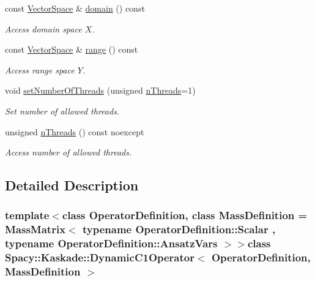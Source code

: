 \begin{DoxyCompactItemize}
\item 
const \hyperlink{classSpacy_1_1VectorSpace}{Vector\+Space} \& \hyperlink{classSpacy_1_1OperatorBase_a2588f9b3e0188820c4c494e63293dc6f_a2588f9b3e0188820c4c494e63293dc6f}{domain} () const 
\begin{DoxyCompactList}\small\item\em Access domain space $X$. \end{DoxyCompactList}\item 
const \hyperlink{classSpacy_1_1VectorSpace}{Vector\+Space} \& \hyperlink{classSpacy_1_1OperatorBase_ab19d3b7a6f290b1079248f1e567e53d6_ab19d3b7a6f290b1079248f1e567e53d6}{range} () const 
\begin{DoxyCompactList}\small\item\em Access range space $Y$. \end{DoxyCompactList}\item 
void \hyperlink{classSpacy_1_1Mixin_1_1NumberOfThreads_ab0c2fca77cb0d613e3bb8ce5bda11fdc_ab0c2fca77cb0d613e3bb8ce5bda11fdc}{set\+Number\+Of\+Threads} (unsigned \hyperlink{classSpacy_1_1Mixin_1_1NumberOfThreads_a385963b95b5e1ddf422393146cc71ee1_a385963b95b5e1ddf422393146cc71ee1}{n\+Threads}=1)
\begin{DoxyCompactList}\small\item\em Set number of allowed threads. \end{DoxyCompactList}\item 
unsigned \hyperlink{classSpacy_1_1Mixin_1_1NumberOfThreads_a385963b95b5e1ddf422393146cc71ee1_a385963b95b5e1ddf422393146cc71ee1}{n\+Threads} () const noexcept
\begin{DoxyCompactList}\small\item\em Access number of allowed threads. \end{DoxyCompactList}\end{DoxyCompactItemize}


\subsection{Detailed Description}
\subsubsection*{template$<$class Operator\+Definition, class Mass\+Definition = Mass\+Matrix$<$ typename Operator\+Definition\+::\+Scalar , typename Operator\+Definition\+::\+Ansatz\+Vars $>$$>$class Spacy\+::\+Kaskade\+::\+Dynamic\+C1\+Operator$<$ Operator\+Definition, Mass\+Definition $>$}


